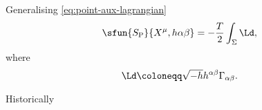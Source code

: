 \documentclass[a4paper,11pt]{article}
\begin{document}
Generalising \eqref{eq:point-aux-lagrangian}
\begin{equation}
\sfun{S_\text{P}}{X^\mu, h{\alpha\beta}} = -\frac{T}{2}\int_\Sigma \Ld,
\end{equation}
where
\begin{equation}
\Ld \coloneqq \sqrt{-h} h^{\alpha\beta}\Gamma_{\alpha\beta}.
\end{equation}



Historically \cite{Brink1976,Deser1976,Polyakov1981}





\printbibliography
\end{document}
